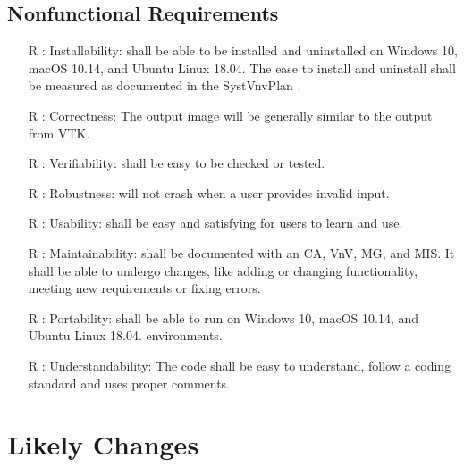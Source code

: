 \documentclass[12pt]{article}
\begin{document}
\subsection{Nonfunctional Requirements}

\begin{itemize}
\item[R\refstepcounter{reqnum}\thereqnum
\label{R_install}:]
Installability: \progname{} shall be able to be installed and uninstalled on
Windows 10, macOS 10.14, and Ubuntu Linux 18.04. The ease to install and
uninstall shall be measured as documented in the SystVnvPlan \cite{Dong2019}.
\item[R\refstepcounter{reqnum}\thereqnum
\label{R_correct}:]
Correctness: The output image will be generally similar to the output from VTK.
\item[R\refstepcounter{reqnum}\thereqnum
\label{R_verify}:]
Verifiability: \progname{} shall be easy to be checked or tested.
\item[R\refstepcounter{reqnum}\thereqnum
\label{R_robust}:]
Robustness: \progname{} will not crash when a user provides invalid input.
\item[R\refstepcounter{reqnum}\thereqnum
\label{R_use}:]
Usability: \progname{} shall be easy and satisfying for users to learn and use.
\item[R\refstepcounter{reqnum}\thereqnum
\label{R_maintain}:]
Maintainability: \progname{} shall be documented with an CA, VnV, MG, and MIS.
It shall be able to undergo changes, like adding or changing functionality,
meeting new requirements or fixing errors.
\item[R\refstepcounter{reqnum}\thereqnum
\label{R_portal}:]
Portability: \progname{} shall be able to run on Windows 10, macOS 10.14, and
Ubuntu Linux 18.04.
environments.
\item[R\refstepcounter{reqnum}\thereqnum
\label{R_understand}:]
Understandability: The code shall be easy to understand, follow a coding
standard and uses proper comments.
\end{itemize}

\section{Likely Changes}
\end{document}
